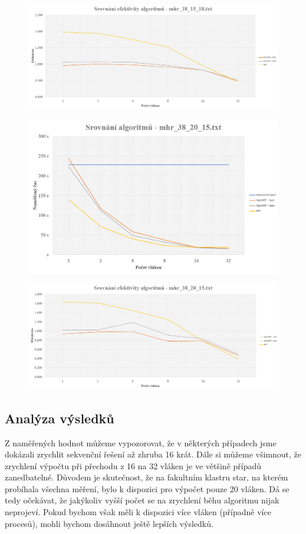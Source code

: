\documentclass{article}
\begin{document}
\begin{figure}[H]
    \centering
    \includegraphics[width=\textwidth]{SE381518.png}
\end{figure}
\begin{figure}[H]
    \centering
    \includegraphics[width=\textwidth]{Srovnani382015.png}
\end{figure}
\begin{figure}[H]
    \centering
    \includegraphics[width=\textwidth]{SE382015.png}
\end{figure}

\subsection{Analýza výsledků}
Z naměřených hodnot můžeme vypozorovat, že v některých případech jsme dokázali zrychlit sekvenční řešení až zhruba 16 krát. Dále si můžeme všimnout, že zrychlení výpočtu při přechodu z 16 na 32 vláken je ve většině případů zanedbatelné. Důvodem je skutečnost, že na fakultním klastru star, na kterém probíhala všechna měření, bylo k dispozici pro výpočet pouze 20 vláken. Dá se tedy očekávat, že jakýkoliv vyšší počet se na zrychlení běhu algoritmu nijak neprojeví. Pokud bychom však měli k dispozici více vláken (případně více procesů), mohli bychom dosáhnout ještě lepších výsledků. 
\end{document}
